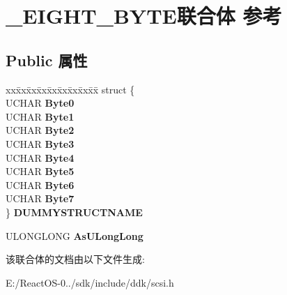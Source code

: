 \hypertarget{union___e_i_g_h_t___b_y_t_e}{}\section{\+\_\+\+E\+I\+G\+H\+T\+\_\+\+B\+Y\+T\+E联合体 参考}
\label{union___e_i_g_h_t___b_y_t_e}
\subsection*{Public 属性}
\begin{DoxyCompactItemize}
\item 
\mbox{\label{union___e_i_g_h_t___b_y_t_e_a88b651d4caec4c5c9ee959e0be0b662a}} 
\begin{tabbing}
xx\=xx\=xx\=xx\=xx\=xx\=xx\=xx\=xx\=\kill
struct \{\\
\>UCHAR {\bfseries Byte0}\\
\>UCHAR {\bfseries Byte1}\\
\>UCHAR {\bfseries Byte2}\\
\>UCHAR {\bfseries Byte3}\\
\>UCHAR {\bfseries Byte4}\\
\>UCHAR {\bfseries Byte5}\\
\>UCHAR {\bfseries Byte6}\\
\>UCHAR {\bfseries Byte7}\\
\} {\bfseries DUMMYSTRUCTNAME}\\

\end{tabbing}\item 
\mbox{\label{union___e_i_g_h_t___b_y_t_e_a4422bef50439f608837750485351456b}} 
U\+L\+O\+N\+G\+L\+O\+NG {\bfseries As\+U\+Long\+Long}
\end{DoxyCompactItemize}


该联合体的文档由以下文件生成\+:\begin{DoxyCompactItemize}
\item 
E\+:/\+React\+O\+S-\/0../sdk/include/ddk/scsi.\+h\end{DoxyCompactItemize}
